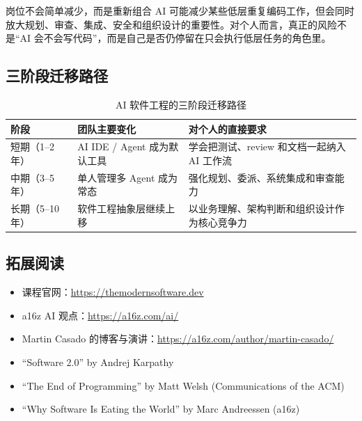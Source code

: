 \documentclass[a4paper]{article}
\begin{document}
\begin{warningbox}{岗位不会简单减少，而是重新组合}
AI 可能减少某些低层重复编码工作，但会同时放大规划、审查、集成、安全和组织设计的重要性。对个人而言，真正的风险不是“AI 会不会写代码”，而是自己是否仍停留在只会执行低层任务的角色里。
\end{warningbox}

\subsection{三阶段迁移路径}

\begin{table}[H]
\centering
\begin{tabular}{p{} p{} p{}}
\toprule
阶段 & 团队主要变化 & 对个人的直接要求 \\
\midrule
短期（1--2 年） & AI IDE / Agent 成为默认工具 & 学会把测试、review 和文档一起纳入 AI 工作流 \\
中期（3--5 年） & 单人管理多 Agent 成为常态 & 强化规划、委派、系统集成和审查能力 \\
长期（5--10 年） & 软件工程抽象层继续上移 & 以业务理解、架构判断和组织设计作为核心竞争力 \\
\bottomrule
\end{tabular}
\caption{AI 软件工程的三阶段迁移路径}
\end{table}

\subsection{拓展阅读}

\begin{itemize}
    \item 课程官网：\url{https://themodernsoftware.dev}
    \item a16z AI 观点：\url{https://a16z.com/ai/}
    \item Martin Casado 的博客与演讲：\url{https://a16z.com/author/martin-casado/}
    \item ``Software 2.0'' by Andrej Karpathy
    \item ``The End of Programming'' by Matt Welsh (Communications of the ACM)
    \item ``Why Software Is Eating the World'' by Marc Andreessen (a16z)
\end{itemize}

\end{document}
